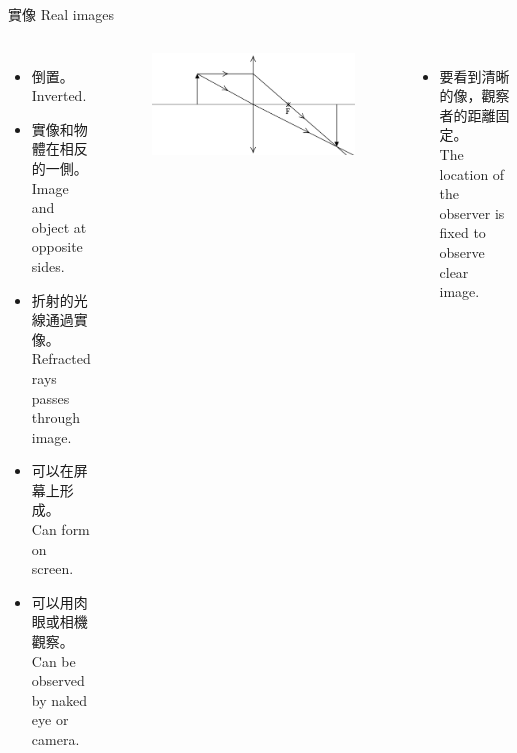 \documentclass[beamer=true]{standalone}
\begin{document}

\begin{frame}
    {實像 Real images}
    \begin{columns}
        \begin{itemize}
            \setlength{\itemsep}{.6em}
            \item 倒置。\\Inverted.
            \item 實像和物體在相反的一側。\\Image and object at opposite sides.
            \item 折射的光線通過實像。\\Refracted rays passes through image.
            \item 可以在屏幕上形成。\\Can form on screen.
            \item 可以用肉眼或相機觀察。\\Can be observed by naked eye or camera.
        \end{itemize}
        \begin{figure}
            \centering
            \includegraphics[width=\linewidth]{assets/x1eni1me.png}
        \end{figure}\bigskip
        \begin{itemize}
            \item 要看到清晰的像，觀察者的距離固定。\\The location of the observer is fixed to observe clear image.
        \end{itemize}
    \end{columns}



\end{frame}
\end{document}
